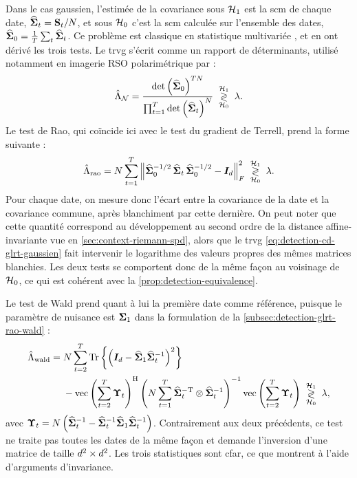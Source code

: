 Dans le cas gaussien, l'estimée de la covariance sous $\mathcal{H}_1$ est la scm de chaque date, $\widehat{\boldsymbol{\Sigma}}_t=\mathbf{S}_t/N$, et sous $\mathcal{H}_0$ c'est la scm calculée sur l'ensemble des dates, $\widehat{\boldsymbol{\Sigma}}_0=\frac{1}{T}\sum_t\widehat{\boldsymbol{\Sigma}}_t$. Ce problème est classique en statistique multivariée \cite{anderson1958introduction}, et  en ont dérivé les trois tests. Le trvg s'écrit comme un rapport de déterminants, utilisé notamment en imagerie RSO polarimétrique par  :
\begin{equation}
  \hat{\Lambda}_{\mathcal{N}}
  =
  \frac{\operatorname{\operatorname{det}}\left(\widehat{\boldsymbol{\Sigma}}_0\right)^{TN}}{\prod_{t=1}^{T}\operatorname{\operatorname{det}}\left(\widehat{\boldsymbol{\Sigma}}_t\right)^{N}}
  \;\underset{\mathcal{H}_0}{\overset{\mathcal{H}_1}{\gtrless}}\; \lambda.
  \label{eq:detection-cd-glrt-gaussien}
\end{equation}
Le test de Rao, qui coïncide ici avec le test du gradient de Terrell, prend la forme suivante \cite{Ciuonzo2017} :
\begin{equation}
  \hat{\Lambda}_{\mathrm{rao}}
  =
  N\sum_{t=1}^{T}
  \left\lVert\widehat{\boldsymbol{\Sigma}}_0^{-1/2}\,\widehat{\boldsymbol{\Sigma}}_t\,\widehat{\boldsymbol{\Sigma}}_0^{-1/2}-\boldsymbol{I}_{d}\right\rVert_F^2
  \;\underset{\mathcal{H}_0}{\overset{\mathcal{H}_1}{\gtrless}}\; \lambda.
  \label{eq:detection-cd-rao}
\end{equation}
Pour chaque date, on mesure donc l'écart entre la covariance de la date et la covariance commune, après blanchiment par cette dernière. On peut noter que cette quantité correspond au développement au second ordre de la distance affine-invariante vue en \cref{sec:context-riemann-spd}, alors que le trvg \cref{eq:detection-cd-glrt-gaussien} fait intervenir le logarithme des valeurs propres des mêmes matrices blanchies. Les deux tests se comportent donc de la même façon au voisinage de $\mathcal{H}_0$, ce qui est cohérent avec la \cref{prop:detection-equivalence}.

Le test de Wald prend quant à lui la première date comme référence, puisque le paramètre de nuisance est $\boldsymbol{\Sigma}_1$ dans la formulation de la \cref{subsec:detection-glrt-rao-wald} :
\begin{equation}
  \begin{aligned}
  \hat{\Lambda}_{\mathrm{wald}}
  ={}&
  N\sum_{t=2}^{T}\operatorname{\operatorname{Tr}}\left\{\left(\boldsymbol{I}_{d}-\widehat{\boldsymbol{\Sigma}}_1{\widehat{\boldsymbol{\Sigma}}_t}^{-1}\right)^2\right\}
  \\
  &- \operatorname{vec}\left(\sum_{t=2}^{T}\boldsymbol{\Upsilon}_t\right)^{\mathrm{H}}
    \left(N\sum_{t=1}^{T}\widehat{\boldsymbol{\Sigma}}_t^{-\mathrm{T}}\otimes{\widehat{\boldsymbol{\Sigma}}_t}^{-1}\right)^{-1}
    \operatorname{vec}\left(\sum_{t=2}^{T}\boldsymbol{\Upsilon}_t\right)
  \;\underset{\mathcal{H}_0}{\overset{\mathcal{H}_1}{\gtrless}}\; \lambda,
  \end{aligned}
  \label{eq:detection-cd-wald}
\end{equation}
avec $\boldsymbol{\Upsilon}_t=N\left({\widehat{\boldsymbol{\Sigma}}_t}^{-1}-{\widehat{\boldsymbol{\Sigma}}_t}^{-1}\widehat{\boldsymbol{\Sigma}}_1{\widehat{\boldsymbol{\Sigma}}_t}^{-1}\right)$. Contrairement aux deux précédents, ce test ne traite pas toutes les dates de la même façon et demande l'inversion d'une matrice de taille $d^2\times d^2$. Les trois statistiques sont cfar, ce que \citet{Ciuonzo2017} montrent à l'aide d'arguments d'invariance.

